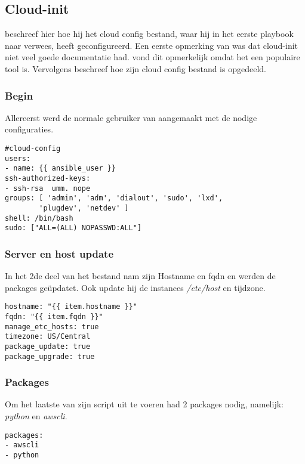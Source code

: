 \subsection{Cloud-init}
\autocite{scottharney} beschreef hier hoe hij het cloud config bestand, waar hij in het eerste playbook naar verwees, heeft geconfigureerd. Een eerste opmerking van \autocite{scottharney} was dat cloud-init niet veel goede documentatie had. \autocite{scottharney} vond dit opmerkelijk omdat het een populaire tool is. Vervolgens beschreef \autocite{scottharney} hoe zijn cloud config bestand is opgedeeld.

\newpage
\subsubsection{Begin}
Allereerst werd de normale gebruiker van \autocite{scottharney} aangemaakt met de nodige configuraties.
\begin{lstlisting}[basicstyle=\small]
#cloud-config
users:
- name: {{ ansible_user }}
ssh-authorized-keys:
- ssh-rsa  umm. nope
groups: [ 'admin', 'adm', 'dialout', 'sudo', 'lxd', 
		'plugdev', 'netdev' ]
shell: /bin/bash
sudo: ["ALL=(ALL) NOPASSWD:ALL"]
\end{lstlisting} 

\subsubsection{Server en host update}
In het 2de deel van het bestand nam \autocite{scottharney} zijn Hostname en fqdn en werden de packages geüpdatet. Ook update hij de instances \textit{/etc/host} en tijdzone.
\begin{lstlisting}[basicstyle=\small]
hostname: "{{ item.hostname }}"
fqdn: "{{ item.fqdn }}"
manage_etc_hosts: true
timezone: US/Central
package_update: true
package_upgrade: true
\end{lstlisting} 

\subsubsection{Packages}
Om het laatste van zijn script uit te voeren had \autocite{scottharney} 2 packages nodig, namelijk: \textit{python} en \textit{awscli}. 
\begin{lstlisting}[basicstyle=\small]
packages:
- awscli
- python
\end{lstlisting}

\newpage
